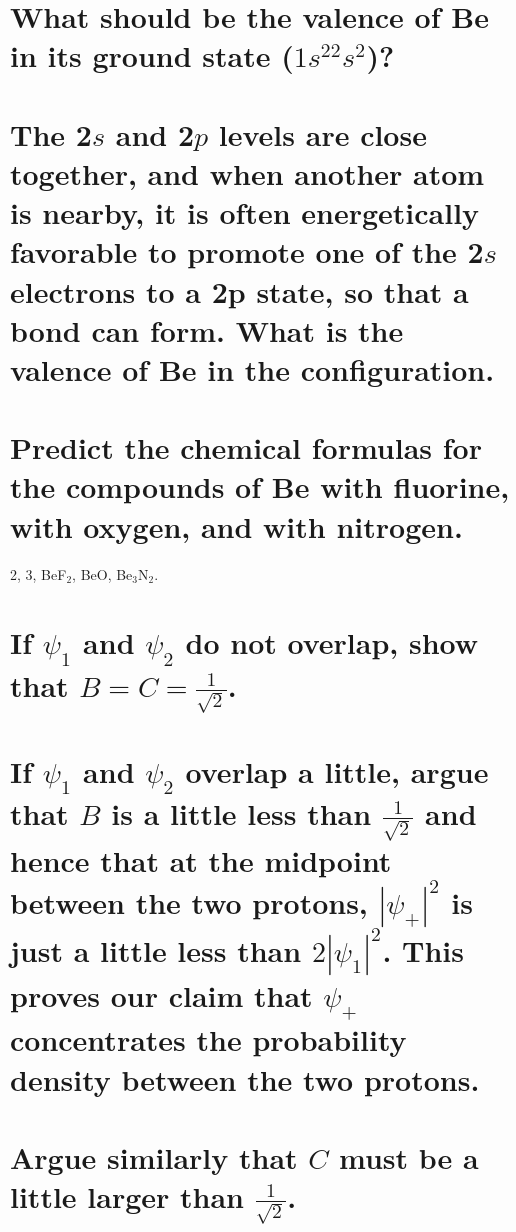 \documentclass[answers]{exam}
\begin{document}
\begin{questions}
\question{}

\begin{parts}
	\part{What should be the valence of Be in its ground state ($1s^22s^2$)?}
	\part{The 2$s$ and 2$p$ levels are close together, and when another atom is nearby, it is often energetically favorable to promote one of the 2$s$ electrons to a 2p state, so that a bond can form. What is the valence of Be in the configuration.}
	\part{Predict the chemical formulas for the compounds of Be with fluorine, with oxygen, and with nitrogen.}
\end{parts}

\begin{solution}
	2, 3, BeF$_2$, BeO, Be$_3$N$_2$.
\end{solution}


\begin{parts}
	\part{If $\psi_1$ and $\psi_2$ do not overlap, show that $B=C=\frac{1}{\sqrt{2}}$.}
	\part{If $\psi_1$ and $\psi_2$ overlap a little, argue that $B$ is a little less than $\frac{1}{\sqrt{2}}$ and hence that at the midpoint between the two protons, $|\psi_+|^2$ is just a little less than $2|\psi_1|^2$. This proves our claim that $\psi_+$ concentrates the probability density between the two protons.}
	\part{Argue similarly that $C$ must be a little larger than $\frac{1}{\sqrt{2}}$.}
\end{parts}


\end{questions}
\end{document}
